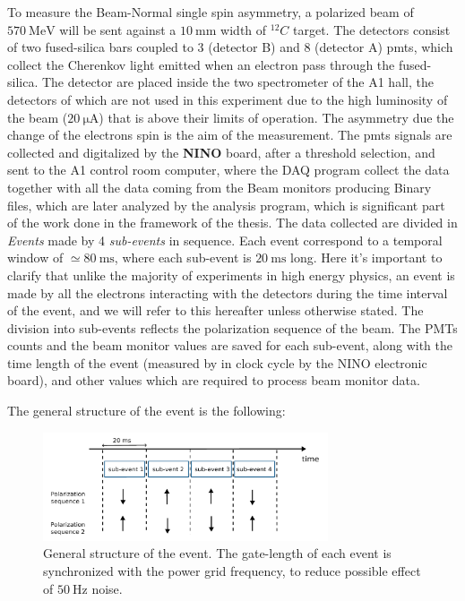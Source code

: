 To measure the Beam-Normal single spin asymmetry, a polarized beam of $ \SI{570}{\mega \electronvolt}$ will be sent against a $\SI{10}{\milli \meter}$ width of $^{12}C$ target. The detectors consist of two fused-silica bars coupled to 3 (detector B) and 8 (detector A) pmts, which collect the Cherenkov light emitted when an electron pass through the fused-silica. 
The detector are placed inside the two spectrometer of the A1 hall, the detectors of which are not used in this experiment due to the high luminosity of the beam ($ \SI{20}{\micro \ampere}$) that is above their limits of operation. 
The asymmetry due the change of the electrons spin is the aim of the measurement. The pmts signals are collected and digitalized by the \textbf{NINO} board, after a threshold selection, and sent to the A1 control room computer, where the DAQ program collect the data together with all the data coming from the Beam monitors producing Binary files, which are later analyzed by the analysis program, which is significant part of the work done in the framework of the thesis. 
The data collected are divided in \textit{Events} made by 4 \textit{sub-events} in sequence. Each event correspond to a temporal window of $\simeq \SI{80}{\milli \second}$, where each sub-event is $\SI{20}{\milli \second}$ long.
 Here it's important to clarify that unlike the majority of experiments in high energy physics, an event is made by all the electrons interacting with the detectors during the time interval of the event, and we will refer to this hereafter unless otherwise stated. The division into sub-events reflects the polarization sequence of the beam. The PMTs counts and the beam monitor values are saved for each sub-event, along with the time length of the event (measured by in clock cycle by the NINO electronic board), and other values which are required to process beam monitor data.

The general structure of the event is the following: 

\begin{figure}[hbtp] 
\centering
\includegraphics[width = 0.75\textwidth]{ExperimentalSetup/EventStructure.pdf}
\caption{General structure of the event. The gate-length of each event is synchronized with the power grid frequency, to reduce possible effect of $\SI{50}{\hertz}$ noise.}
\label{fig:EventStructure}
\end{figure}

